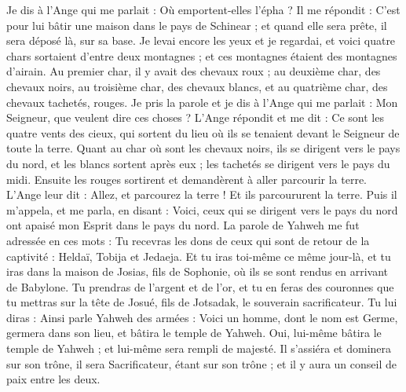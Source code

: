\begin{multicols}{2}
Je dis à l'Ange qui me parlait : Où emportent-elles l'épha ?
Il me répondit : C'est pour lui bâtir une maison dans le pays de Schinear ; et quand elle sera prête, il sera déposé là, sur sa base.
\VerseOne{}Je levai encore les yeux et je regardai, et voici quatre chars sortaient d'entre deux montagnes ; et ces montagnes étaient des montagnes d'airain.
Au premier char, il y avait des chevaux roux ; au deuxième char, des chevaux noirs,
au troisième char, des chevaux blancs, et au quatrième char, des chevaux tachetés, rouges.
Je pris la parole et je dis à l'Ange qui me parlait : Mon Seigneur, que veulent dire ces choses ?
L'Ange répondit et me dit : Ce sont les quatre vents des cieux, qui sortent du lieu où ils se tenaient devant le Seigneur de toute la terre.
Quant au char où sont les chevaux noirs, ils se dirigent vers le pays du nord, et les blancs sortent après eux ; les tachetés se dirigent vers le pays du midi.
Ensuite les rouges sortirent et demandèrent à aller parcourir la terre. L'Ange leur dit : Allez, et parcourez la terre ! Et ils parcoururent la terre.
Puis il m'appela, et me parla, en disant : Voici, ceux qui se dirigent vers le pays du nord ont apaisé mon Esprit dans le pays du nord.
La parole de Yahweh me fut adressée en ces mots :
Tu recevras les dons de ceux qui sont de retour de la captivité : Heldaï, Tobija et Jedaeja. Et tu iras toi-même ce même jour-là, et tu iras dans la maison de Josias, fils de Sophonie, où ils se sont rendus en arrivant de Babylone.
Tu prendras de l'argent et de l'or, et tu en feras des couronnes que tu mettras sur la tête de Josué, fils de Jotsadak, le souverain sacrificateur.
Tu lui diras : Ainsi parle Yahweh des armées : Voici un homme, dont le nom est Germe, germera dans son lieu, et bâtira le temple de Yahweh.
Oui, lui-même bâtira le temple de Yahweh ; et lui-même sera rempli de majesté. Il s'assiéra et dominera sur son trône, il sera Sacrificateur, étant sur son trône ; et il y aura un conseil de paix entre les deux.

\end{multicols}
